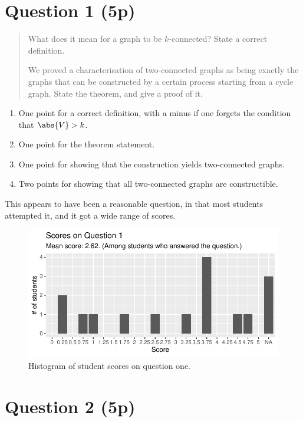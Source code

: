 \documentclass[nobib]{tufte-handout}
\begin{document}
\section{Question 1 (5p)} %

\begin{quotation}
  What does it mean for a graph to be $k$-connected? State a correct definition.

  We proved a characterisation of two-connected graphs as being exactly the graphs that can be constructed by a certain process starting from a cycle graph. State the theorem, and give a proof of it.
\end{quotation}

\begin{enumerate}
  \item One point for a correct definition, with a minus if one forgets the condition that $\abs{V} > k$.
  \item One point for the theorem statement.
  \item One point for showing that the construction yields two-connected graphs.
  \item Two points for showing that all two-connected graphs are constructible.
\end{enumerate}

This appears to have been a reasonable question, in that most students attempted it, and it got a wide range of scores.

\begin{figure}[p]
  \centering
  \includegraphics[width = \textwidth]{Q1.pdf}
  \caption[Score histogram for Q1]{Histogram of student scores on question one.}
  \label{fig:Q1}
\end{figure}

\section{Question 2 (5p)} %
\end{document}
